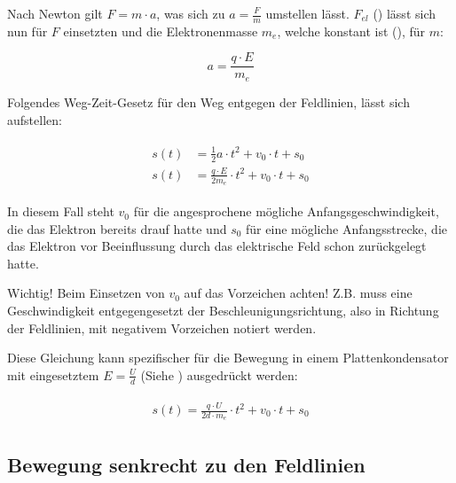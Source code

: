 
Nach Newton gilt $F = m \cdot a$, was sich zu $a = \frac{F}{m}$ umstellen lässt. $F_{el}$ () lässt sich nun für $F$ einsetzten und die Elektronenmasse $m_e$, welche konstant ist (), für $m$:

\begin{equation}
	a = \frac{q \cdot E}{m_e}
\end{equation}


Folgendes Weg-Zeit-Gesetz für den Weg entgegen der Feldlinien, lässt sich aufstellen:

\begin{align} \label{eq:s(t)Allgemein}
\begin{split}
	s(t) &= \frac{1}{2} a \cdot t^2 + v_0 \cdot t + s_0 \\
	s(t) &= \frac{q \cdot E}{2m_e} \cdot t^2 + v_0 \cdot t + s_0
\end{split}
\end{align}

\noindent In diesem Fall steht $v_0$ für die angesprochene mögliche Anfangsgeschwindigkeit, die das Elektron bereits \glqq drauf hatte\grqq{} und $s_0$ für eine mögliche Anfangsstrecke, die das Elektron vor Beeinflussung durch das elektrische Feld schon zurückgelegt hatte.

\begin{leftbar}
Wichtig! Beim Einsetzen von $v_0$ auf das Vorzeichen achten! Z.B. muss eine Geschwindigkeit entgegengesetzt der Beschleunigungsrichtung, also in Richtung der Feldlinien, mit negativem Vorzeichen notiert werden.
\end{leftbar}

Diese Gleichung kann spezifischer für die Bewegung in einem Plattenkondensator mit eingesetztem $E=\frac{U}{d}$ (Siehe ) ausgedrückt werden:

\begin{align} \label{eq:s(t)imKondensator}
\begin{split}
	s(t) = \frac{q \cdot U}{2d \cdot m_e} \cdot t^2 + v_0 \cdot t + s_0
\end{split}
\end{align}


\subsection{Bewegung senkrecht zu den Feldlinien} \label{subsec:BewegungsgesetzSenkrecht}

